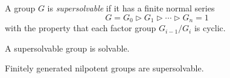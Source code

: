\documentclass[12pt]{article}
\begin{document}
A group $G$ is \emph{supersolvable} if it has a finite normal series
$$G = G_0 \rhd G_1 \rhd \cdots \rhd G_n = 1$$
with the property that each factor group $G_{i-1}/G_i$ is cyclic.

A supersolvable group is solvable.

Finitely generated nilpotent groups are supersolvable.
\end{document}
